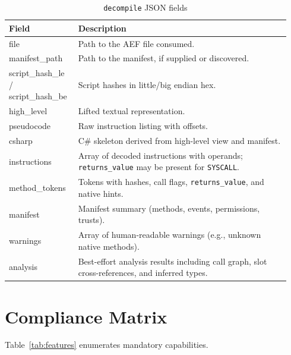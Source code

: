 \documentclass[11pt]{article}
\begin{document}
\begin{longtable}{@{}p{0.22\linewidth}p{0.72\linewidth}@{}}
\caption{\texttt{decompile} JSON fields}\label{tab:json-fields}\\
\toprule
Field & Description \\
\midrule
file & Path to the AEF file consumed.\\
manifest\_path & Path to the manifest, if supplied or discovered.\\
script\_hash\_le / script\_hash\_be & Script hashes in little/big endian hex.\\
high\_level & Lifted textual representation.\\
pseudocode & Raw instruction listing with offsets.\\
csharp & C\# skeleton derived from high-level view and manifest.\\
instructions & Array of decoded instructions with operands; \texttt{returns\_value} may be present for \texttt{SYSCALL}.\\
method\_tokens & Tokens with hashes, call flags, \texttt{returns\_value}, and native hints.\\
manifest & Manifest summary (methods, events, permissions, trusts).\\
warnings & Array of human-readable warnings (e.g., unknown native methods).\\
analysis & Best-effort analysis results including call graph, slot cross-references, and inferred types.\\
\bottomrule
\end{longtable}

\section{Compliance Matrix}\label{sec:compliance}
Table~\ref{tab:features} enumerates mandatory capabilities.
\end{document}
